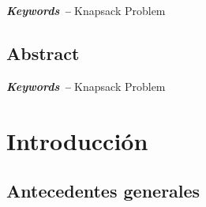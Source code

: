 \documentclass[spanish, a4paper, 12pt, twoside, openany,final]{book}
\numberwithin{equation}{section}                %
\begin{document}
    \par\vspace*{\fill} %
    \textbf{\textit{Keywords --}} Knapsack Problem %
    
    \newpage
    \section*{Abstract}
    
    \par\vspace*{\fill} %
    \textbf{\textit{Keywords --}} Knapsack Problem %



\newpage
{   %
\tableofcontents
}

\newpage
{ 
\listoftables}

\newpage
{ 
\listoffigures}


\newpage
{}   %
\setcounter{page}{1}                                    %


\chapter{Introducción}
\section{Antecedentes generales}
\end{document}
